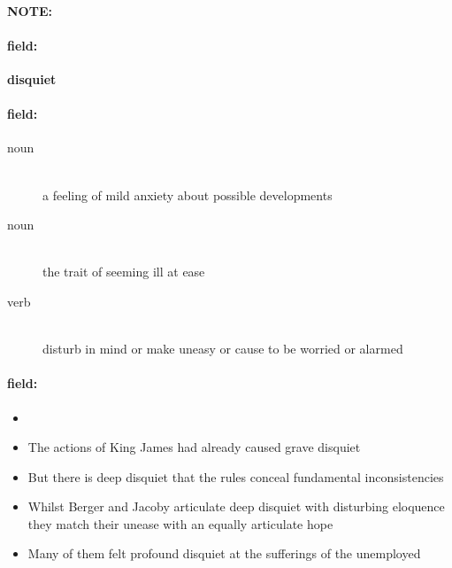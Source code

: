 \documentclass[12pt]{article}
\newenvironment{note}{\paragraph{NOTE:}}{}
\newenvironment{field}{\paragraph{field:}}{}
\begin{document}
\begin{note}
\begin{field}
\textbf{\large disquiet}
\end{field}


\begin{field}
\begin{description}
\item[noun] \hfill \\ 
a feeling of mild anxiety about possible developments

\item[noun] \hfill \\ 
the trait of seeming ill at ease

\item[verb] \hfill \\ 
disturb in mind or make uneasy or cause to be worried or alarmed

\end{description}
\end{field}

\begin{field}
\begin{itemize}
\item 
\item The actions of King James had already caused grave disquiet
\item But there is deep disquiet that the rules conceal fundamental inconsistencies
\item Whilst Berger and Jacoby articulate deep disquiet with disturbing eloquence they match their unease with an equally articulate hope
\item Many of them felt profound disquiet at the sufferings of the unemployed
\end{itemize}
\end{field}
\end{note}
\end{document}
